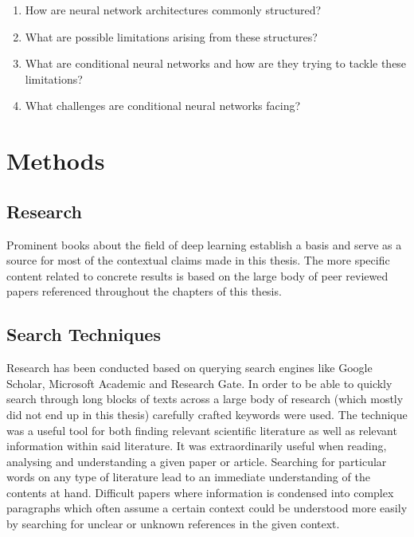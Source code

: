 \begin{enumerate} 
  \item	How are neural network architectures commonly structured?
  \item What are possible limitations arising from these structures?
  \item What are conditional neural networks and how are they trying to tackle these limitations?
  \item What challenges are conditional neural networks facing?
\end{enumerate}
 




\section{Methods}
 
\subsection{Research}
  Prominent books about the field of deep learning establish a 
basis and serve as a source for most of the contextual claims made in this thesis.
\cite{Goodfellow-et-al-2016} \cite{nielsenneural} \cite{Patterson-Gibson-2017}
The more specific content related to concrete results is based on the 
large body of peer reviewed papers referenced throughout the chapters of this thesis.


\subsection{Search Techniques}
  
Research has been conducted based on querying search engines
like Google Scholar, Microsoft Academic and Research Gate.
In order to be able to quickly search through long blocks of texts across
a large body of research (which mostly did not end up in this thesis) carefully crafted keywords were used.
The technique was a useful tool for both
finding relevant scientific literature as well as relevant information within said literature.
It was extraordinarily useful when reading, analysing and understanding a given paper or article.
Searching for particular words on any type of literature lead to an immediate understanding of the contents at hand.
Difficult papers where information is condensed into complex paragraphs which often assume a certain context could be understood more easily by searching for unclear or unknown references in the given context.
  

